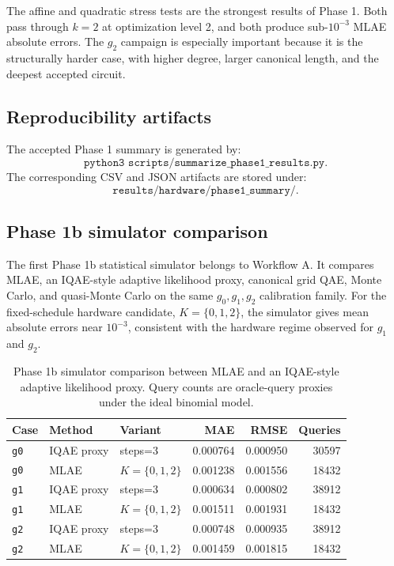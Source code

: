 The affine and quadratic stress tests are the strongest results of Phase 1.
Both pass through \(k=2\) at optimization level 2, and both produce sub-\(10^{-3}\)
MLAE absolute errors. The \(g_2\) campaign is especially important because it is
the structurally harder case, with higher degree, larger canonical length, and
the deepest accepted circuit.

\subsection{Reproducibility artifacts}

The accepted Phase 1 summary is generated by:
\[
  \texttt{python3 scripts/summarize\_phase1\_results.py}.
\]
The corresponding CSV and JSON artifacts are stored under:
\[
  \texttt{results/hardware/phase1\_summary/}.
\]

\subsection{Phase 1b simulator comparison}

The first Phase 1b statistical simulator belongs to Workflow A. It compares
MLAE, an IQAE-style adaptive
likelihood proxy, canonical grid QAE, Monte Carlo, and quasi-Monte Carlo on the
same \(g_0,g_1,g_2\) calibration family. For the fixed-schedule hardware
candidate, \(K=\{0,1,2\}\), the simulator gives mean absolute errors near
\(10^{-3}\), consistent with the hardware regime observed for \(g_1\) and
\(g_2\).

\begin{table}[h]
\centering
\begin{tabular}{lllrrr}
\toprule
Case & Method & Variant & MAE & RMSE & Queries \\
\midrule
\texttt{g0} & IQAE proxy & steps=3 & 0.000764 & 0.000950 & 30597 \\
\texttt{g0} & MLAE & \(K=\{0,1,2\}\) & 0.001238 & 0.001556 & 18432 \\
\texttt{g1} & IQAE proxy & steps=3 & 0.000634 & 0.000802 & 38912 \\
\texttt{g1} & MLAE & \(K=\{0,1,2\}\) & 0.001511 & 0.001931 & 18432 \\
\texttt{g2} & IQAE proxy & steps=3 & 0.000748 & 0.000935 & 38912 \\
\texttt{g2} & MLAE & \(K=\{0,1,2\}\) & 0.001459 & 0.001815 & 18432 \\
\bottomrule
\end{tabular}
\caption{Phase 1b simulator comparison between MLAE and an IQAE-style adaptive
likelihood proxy. Query counts are oracle-query proxies under the ideal
binomial model.}
\label{tab:phase1b-simulator}
\end{table}

